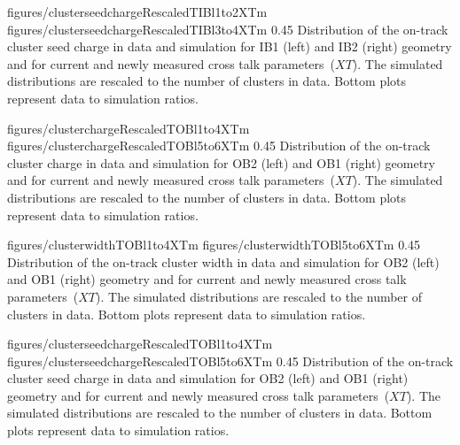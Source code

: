                  {figures/clusterseedchargeRescaledTIBl1to2XTm} %
                 {figures/clusterseedchargeRescaledTIBl3to4XTm} %
                 {0.45}       %
                 { Distribution of the on-track cluster seed charge in data and simulation for IB1 (left) and IB2 (right) geometry and for current and newly measured cross talk parameters~($XT$).  The simulated distributions are rescaled to the number of clusters in data.  Bottom plots represent data to simulation ratios. }


                 {figures/clusterchargeRescaledTOBl1to4XTm} %
                 {figures/clusterchargeRescaledTOBl5to6XTm} %
                 {0.45}       %
                 { Distribution of the on-track cluster charge in data and simulation for OB2 (left) and OB1 (right) geometry and for current and newly measured cross talk parameters~($XT$).  The simulated distributions are rescaled to the number of clusters in data.  Bottom plots represent data to simulation ratios. }

                 {figures/clusterwidthTOBl1to4XTm}
                 {figures/clusterwidthTOBl5to6XTm}
                 {0.45}       %
                 { Distribution of the on-track cluster width in data and simulation for OB2 (left) and OB1 (right) geometry and for current and newly measured cross talk parameters~($XT$).  The simulated distributions are rescaled to the number of clusters in data.  Bottom plots represent data to simulation ratios. }

                 {figures/clusterseedchargeRescaledTOBl1to4XTm} %
                 {figures/clusterseedchargeRescaledTOBl5to6XTm} %
                 {0.45}       %
                 { Distribution of the on-track cluster seed charge in data and simulation for OB2 (left) and OB1 (right) geometry and for current and newly measured cross talk parameters~($XT$).  The simulated distributions are rescaled to the number of clusters in data.  Bottom plots represent data to simulation ratios. }


